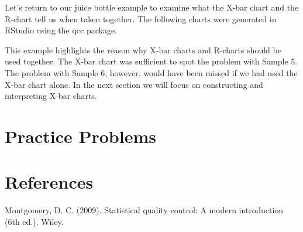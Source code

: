 \documentclass{ximera}
\begin{document}
Let's return to our juice bottle example to examine what the X-bar chart and the R-chart tell us when taken together.  The following charts were generated in RStudio using the qcc package.

\begin{center}
       \end{center}

This example highlights the reason why X-bar charts and R-charts should be used together.  The X-bar chart was sufficient to spot the problem with Sample 5.  The problem with Sample 6, however, would have been missed if we had used the X-bar chart alone.  In the next section we will focus on constructing and interpreting X-bar charts.

\section*{Practice Problems}

\section*{References}

Montgomery, D. C. (2009). Statistical quality control: A modern introduction (6th ed.). Wiley.
\end{document}
